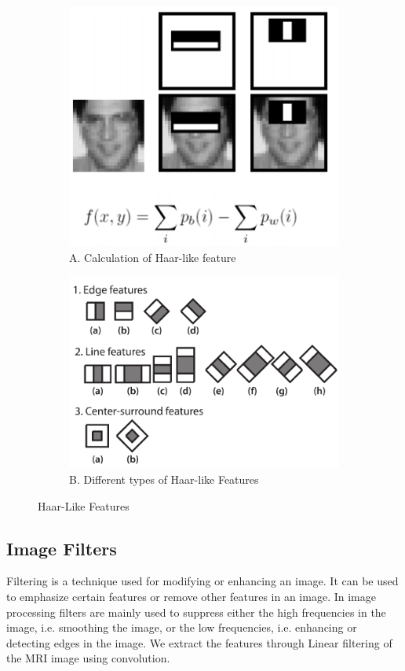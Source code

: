 \documentclass{article} %
\begin{document}
\begin{figure}[h]

\centering
\begin{subfigure}[b]{.4\linewidth}
\centering
\includegraphics[scale=0.4]{haar}
\caption{ A. Calculation of Haar-like feature}
\end{subfigure}

\begin{subfigure}[b]{.4\linewidth}
\centering
\includegraphics[scale=0.4]{HaarFeatures}
\caption{ B. Different types of Haar-like Features}
\end{subfigure}

\caption{Haar-Like Features}
\end{figure}

\subsection{Image Filters}
Filtering is a technique used for modifying or enhancing an image. It can be used to emphasize certain features or remove other features in an image. In image processing filters are mainly used to suppress either the high frequencies in the image, i.e. smoothing the image, or the low frequencies, i.e. enhancing or detecting edges in the image. We extract the features through Linear filtering of the MRI image using convolution. 
\end{document}

